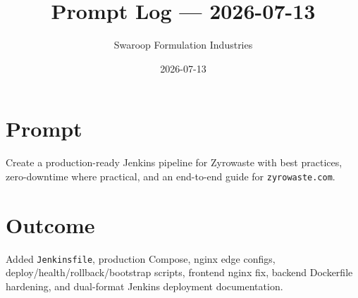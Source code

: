 \documentclass[12pt,a4paper]{article}
\title{Prompt Log --- 2026-07-13}
\author{Swaroop Formulation Industries}
\date{2026-07-13}
\begin{document}
\maketitle
\section{Prompt}
Create a production-ready Jenkins pipeline for Zyrowaste with best practices, zero-downtime where practical, and an end-to-end guide for \texttt{zyrowaste.com}.
\section{Outcome}
Added \texttt{Jenkinsfile}, production Compose, nginx edge configs, deploy/health/rollback/bootstrap scripts, frontend nginx fix, backend Dockerfile hardening, and dual-format Jenkins deployment documentation.
\end{document}
